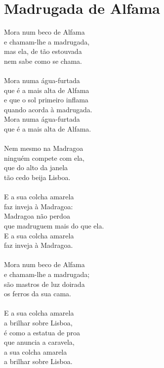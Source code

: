 \documentclass{article}
\begin{document}
\section{ Madrugada de Alfama}
Mora num beco de Alfama\\
e chamam-lhe a madrugada,\\
mas ela, de tão estouvada\\
nem sabe como se chama.\\
\\
Mora numa água-furtada\\
que é a mais alta de Alfama\\
e que o sol primeiro inflama\\
quando acorda à madrugada.\\
Mora numa água-furtada\\
que é a mais alta de Alfama.\\
\\
Nem mesmo na Madragoa\\
ninguém compete com ela,\\
que do alto da janela\\
tão cedo beija Lisboa.\\
\\
E a sua colcha amarela\\
faz inveja à Madragoa:\\
Madragoa não perdoa\\
que madruguem mais do que ela.\\
E a sua colcha amarela\\
faz inveja à Madragoa.\\
\\
Mora num beco de Alfama\\
e chamam-lhe a madrugada;\\
são mastros de luz doirada\\
os ferros da sua cama.\\
\\
E a sua colcha amarela\\
a brilhar sobre Lisboa,\\
é como a estatua de proa\\
que anuncia a caravela,\\
a sua colcha amarela\\
a brilhar sobre Lisboa.\\
\\
\\
\end{document}
